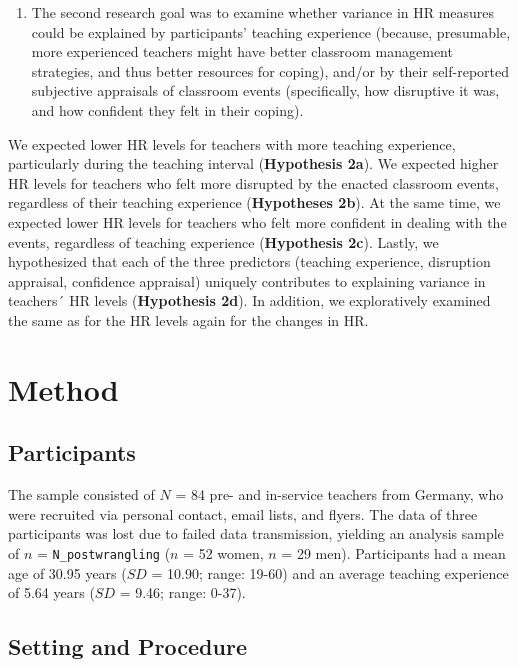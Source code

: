\documentclass[preprint, 3p,
authoryear]{elsarticle} %
\providecommand{\tightlist}{%
  \setlength{\itemsep}{0pt}\setlength{\parskip}{0pt}}
\begin{document}
\begin{enumerate}
\def\labelenumi{(\arabic{enumi})}
\setcounter{enumi}{1}
\tightlist
\item
  The second research goal was to examine whether variance in HR
  measures could be explained by participants' teaching experience
  (because, presumable, more experienced teachers might have better
  classroom management strategies, and thus better resources for
  coping), and/or by their self-reported subjective appraisals of
  classroom events (specifically, how disruptive it was, and how
  confident they felt in their coping).
\end{enumerate}

We expected lower HR levels for teachers with more teaching experience,
particularly during the teaching interval (\textbf{Hypothesis 2a}). We
expected higher HR levels for teachers who felt more disrupted by the
enacted classroom events, regardless of their teaching experience
(\textbf{Hypotheses 2b}). At the same time, we expected lower HR levels
for teachers who felt more confident in dealing with the events,
regardless of teaching experience (\textbf{Hypothesis 2c}). Lastly, we
hypothesized that each of the three predictors (teaching experience,
disruption appraisal, confidence appraisal) uniquely contributes to
explaining variance in teachers´ HR levels (\textbf{Hypothesis 2d}). In
addition, we exploratively examined the same as for the HR levels again
for the changes in HR.

\section{Method}\label{method}

\subsection{Participants}\label{participants}

The sample consisted of \(N\) = 84 pre- and in-service teachers from
Germany, who were recruited via personal contact, email lists, and
flyers. The data of three participants was lost due to failed data
transmission, yielding an analysis sample of \(n\) =
\texttt{N\_postwrangling} (\(n\) = 52 women, \(n\) = 29 men).
Participants had a mean age of 30.95 years (\(SD\) = 10.90; range:
19-60) and an average teaching experience of 5.64 years (\(SD\) = 9.46;
range: 0-37).

\subsection{Setting and Procedure}\label{setting-and-procedure}
\end{document}

